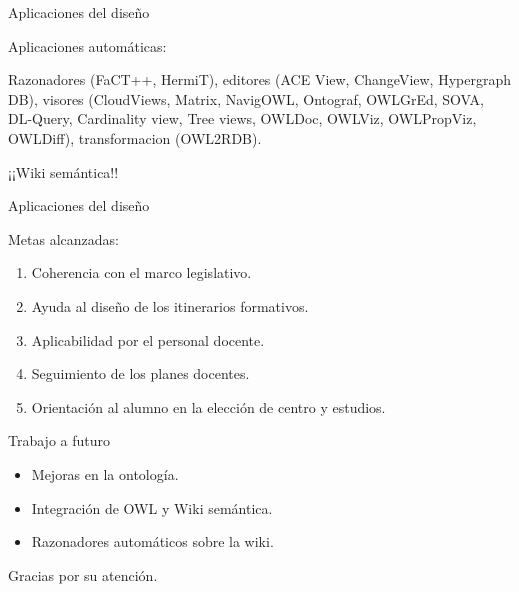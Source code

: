 \documentclass[notes=show,19 pt]{beamer}
\begin{document}
\begin{frame}{Aplicaciones del diseño}
\begin{LARGE}
	Aplicaciones automáticas:
	
	Razonadores (FaCT++, HermiT), editores (ACE View, ChangeView, Hypergraph DB), visores (CloudViews, Matrix, NavigOWL, Ontograf, OWLGrEd, SOVA, DL-Query, Cardinality view, Tree views, OWLDoc, OWLViz, OWLPropViz, OWLDiff), transformacion (OWL2RDB).
\end{LARGE}
	
\begin{center}
	{\Huge ¡¡Wiki semántica!!}
\end{center}
\end{frame}


\begin{frame}{Aplicaciones del diseño}
\begin{LARGE}
	Metas alcanzadas:
	\begin{enumerate}
		\item Coherencia con el marco legislativo.
		\item Ayuda al diseño de los itinerarios formativos.
		\item Aplicabilidad por el personal docente.
		\item Seguimiento de los planes docentes.
		\item Orientación al alumno en la elección de centro y estudios.
	\end{enumerate}
\end{LARGE}
\end{frame}

\begin{frame}{Trabajo a futuro}
\begin{LARGE}
	\begin{itemize}
		\item Mejoras en la ontología.
		\item Integración de OWL y Wiki semántica.
		\item Razonadores automáticos sobre la wiki.
	\end{itemize}
\end{LARGE}
\end{frame}

\begin{frame}[c]{}
	\begin{Huge}
	\begin{center}
		Gracias por su atención.
	\end{center}
	\end{Huge}
\end{frame}
\end{document}
